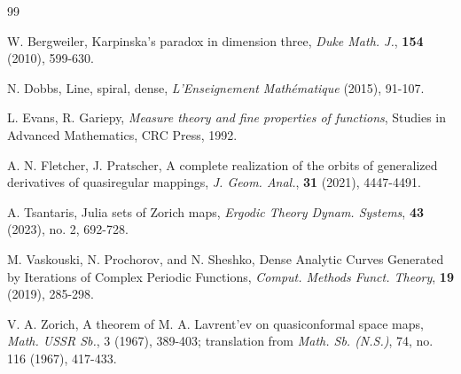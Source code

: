 \documentclass[11pt]{amsart}
\numberwithin{equation}{section}
\theoremstyle{definition}
\theoremstyle{definition}
\theoremstyle{definition}
\begin{document}
\begin{thebibliography}{99}

W. Bergweiler, 
Karpinska's paradox in dimension three, 
\textit{Duke Math. J.}, {\bf 154} (2010), 599-630.

N. Dobbs, 
Line, spiral, dense, 
\textit{L'Enseignement Math\'ematique} (2015), 91-107.

L. Evans, R. Gariepy,
{\it Measure theory and fine properties of functions},
Studies in Advanced Mathematics, CRC Press, 1992.

A. N. Fletcher, J. Pratscher,
A complete realization of the orbits of generalized derivatives of quasiregular mappings,
{\it J. Geom. Anal.}, {\bf 31} (2021), 4447-4491. 

A. Tsantaris,
Julia sets of Zorich maps, 
\textit{Ergodic Theory Dynam. Systems}, {\bf 43} (2023), no. 2, 692-728.

M. Vaskouski, N. Prochorov, and N. Sheshko,
Dense Analytic Curves Generated by Iterations of Complex Periodic Functions,
\textit{Comput. Methods Funct. Theory}, {\bf 19} (2019), 285-298.

V. A. Zorich,
A theorem of M. A. Lavrent'ev on quasiconformal space maps, 
\textit{Math. USSR Sb.}, 3 (1967), 389-403; translation from 
\textit{Math. Sb. (N.S.)}, 74, no. 116 (1967), 417-433.



\end{thebibliography}
\end{document}
